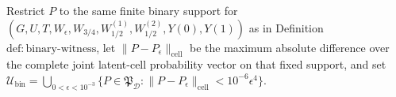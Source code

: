 Restrict \(P\) to the same finite binary support for \((G,U,T,W_{\epsilon},W_{3/4},W_{1/2}^{(1)},W_{1/2}^{(2)},Y(0),Y(1))\) as in Definition \(\mathrm{def{:}binary\text{-}witness}\), let \(\|P-P_{\epsilon}\|_{\mathrm{cell}}\) be the maximum absolute difference over the complete joint latent-cell probability vector on that fixed support, and set \(\mathcal U_{\mathrm{bin}}=\bigcup_{0<\epsilon<10^{-3}}\{P\in\mathfrak P_{\mathcal D}:\|P-P_{\epsilon}\|_{\mathrm{cell}}<10^{-6}\epsilon^4\}\).